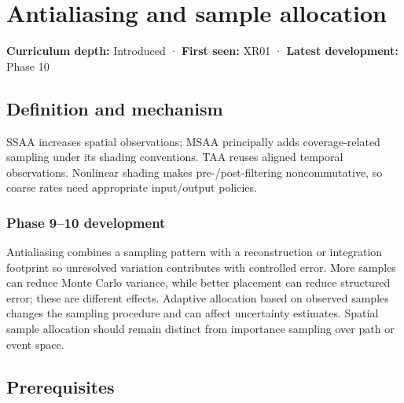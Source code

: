 \hypertarget{appendix-4192b2bdd21e}{}\label{referencestart:appendix-4192b2bdd21e}
\section{Antialiasing and sample allocation}\label{appendix-4192b2bdd21e-antialiasing-and-sample-allocation}

\hypertarget{appendix-4192b2bdd21e-antialiasing-and-sample-allocation}{}

\textbf{Curriculum depth:} Introduced · \textbf{First seen:} XR01 · \textbf{Latest development:} Phase 10

\begin{allmightroledefinition}

\subsection{Definition and mechanism}\label{appendix-4192b2bdd21e-definition-and-mechanism}

\hypertarget{appendix-4192b2bdd21e-definition-and-mechanism}{}

SSAA increases spatial observations; MSAA principally adds coverage-related sampling under its shading conventions. TAA reuses aligned temporal observations. Nonlinear shading makes pre-/post-filtering noncommutative, so coarse rates need appropriate input/output policies.

\end{allmightroledefinition}

\subsubsection{Phase 9--10 development}\label{appendix-4192b2bdd21e-phase-910-development}

\hypertarget{appendix-4192b2bdd21e-phase-910-development}{}

Antialiasing combines a sampling pattern with a reconstruction or integration footprint so unresolved variation contributes with controlled error. More samples can reduce Monte Carlo variance, while better placement can reduce structured error; these are different effects. Adaptive allocation based on observed samples changes the sampling procedure and can affect uncertainty estimates. Spatial sample allocation should remain distinct from importance sampling over path or event space.

\subsection{Prerequisites}\label{appendix-4192b2bdd21e-prerequisites}

